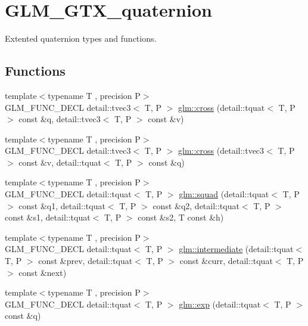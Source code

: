 \hypertarget{group__gtx__quaternion}{\section{G\-L\-M\-\_\-\-G\-T\-X\-\_\-quaternion}
\label{group__gtx__quaternion}
}


Extented quaternion types and functions.  


\subsection*{Functions}
\begin{DoxyCompactItemize}
\item 
{\footnotesize template$<$typename T , precision P$>$ }\\G\-L\-M\-\_\-\-F\-U\-N\-C\-\_\-\-D\-E\-C\-L detail\-::tvec3$<$ T, P $>$ \hyperlink{group__gtx__quaternion_ga8b5c3ff869c773f26d0a562dfcd3f9e4}{glm\-::cross} (detail\-::tquat$<$ T, P $>$ const \&q, detail\-::tvec3$<$ T, P $>$ const \&v)
\item 
{\footnotesize template$<$typename T , precision P$>$ }\\G\-L\-M\-\_\-\-F\-U\-N\-C\-\_\-\-D\-E\-C\-L detail\-::tvec3$<$ T, P $>$ \hyperlink{group__gtx__quaternion_ga7794f940ba271ff846ea706204b0259a}{glm\-::cross} (detail\-::tvec3$<$ T, P $>$ const \&v, detail\-::tquat$<$ T, P $>$ const \&q)
\item 
{\footnotesize template$<$typename T , precision P$>$ }\\G\-L\-M\-\_\-\-F\-U\-N\-C\-\_\-\-D\-E\-C\-L detail\-::tquat$<$ T, P $>$ \hyperlink{group__gtx__quaternion_ga5e756a5817856a3d69f0974fac8322e2}{glm\-::squad} (detail\-::tquat$<$ T, P $>$ const \&q1, detail\-::tquat$<$ T, P $>$ const \&q2, detail\-::tquat$<$ T, P $>$ const \&s1, detail\-::tquat$<$ T, P $>$ const \&s2, T const \&h)
\item 
{\footnotesize template$<$typename T , precision P$>$ }\\G\-L\-M\-\_\-\-F\-U\-N\-C\-\_\-\-D\-E\-C\-L detail\-::tquat$<$ T, P $>$ \hyperlink{group__gtx__quaternion_ga96cb50103d939ea50d8b80bc898b2a35}{glm\-::intermediate} (detail\-::tquat$<$ T, P $>$ const \&prev, detail\-::tquat$<$ T, P $>$ const \&curr, detail\-::tquat$<$ T, P $>$ const \&next)
\item 
{\footnotesize template$<$typename T , precision P$>$ }\\G\-L\-M\-\_\-\-F\-U\-N\-C\-\_\-\-D\-E\-C\-L detail\-::tquat$<$ T, P $>$ \hyperlink{group__gtx__quaternion_gaadebfad5c8b4b3dde114915f0494b739}{glm\-::exp} (detail\-::tquat$<$ T, P $>$ const \&q)

\end{DoxyCompactItemize}
